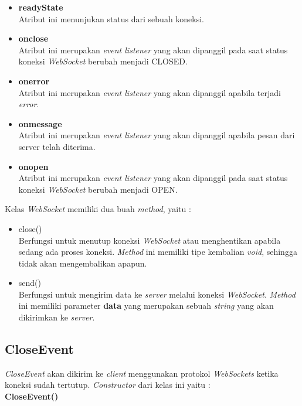 \begin{itemize}
	\item \textbf{readyState} \\ Atribut ini menunjukan status dari sebuah koneksi.
	\item \textbf{onclose} \\ Atribut ini merupakan \textit{event listener} yang akan dipanggil pada saat status koneksi \textit{WebSocket} berubah menjadi CLOSED.
	\item \textbf{onerror} \\ Atribut ini merupakan \textit{event listener} yang akan dipanggil apabila terjadi \textit{error}.
	\item \textbf{onmessage} \\ Atribut ini merupakan \textit{event listener} yang akan dipanggil apabila pesan dari server telah diterima.
	\item \textbf{onopen} \\ Atribut ini merupakan \textit{event listener} yang akan dipanggil pada saat status koneksi \textit{WebSocket} berubah menjadi OPEN.
\end{itemize}

Kelas \textit{WebSocket} memiliki dua buah \textit{method}, yaitu : 

\begin{itemize}
	\item close() \\ Berfungsi untuk menutup koneksi \textit{WebSocket} atau menghentikan apabila sedang ada proses koneksi. \textit{Method} ini memiliki tipe kembalian \textit{void}, sehingga tidak akan mengembalikan apapun.
	\item send() \\ Berfungsi untuk mengirim data ke \textit{server} melalui koneksi \textit{WebSocket}. \textit{Method} ini memiliki parameter \textbf{data} yang merupakan sebuah \textit{string} yang akan dikirimkan ke \textit{server}.
\end{itemize}

\subsection{CloseEvent}
\textit{CloseEvent} akan dikirim ke \textit{client} menggunakan protokol \textit{WebSockets} ketika koneksi sudah tertutup. \textit{Constructor} dari kelas ini yaitu : \\

\textbf{CloseEvent()} \\

